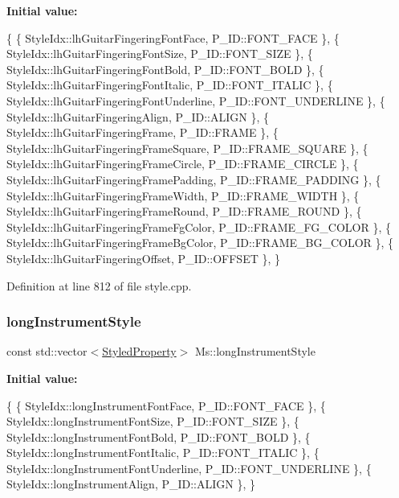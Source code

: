 {\bfseries Initial value\+:}
\begin{DoxyCode}
\{
      \{ StyleIdx::lhGuitarFingeringFontFace,          P\_ID::FONT\_FACE              \},
      \{ StyleIdx::lhGuitarFingeringFontSize,          P\_ID::FONT\_SIZE              \},
      \{ StyleIdx::lhGuitarFingeringFontBold,          P\_ID::FONT\_BOLD              \},
      \{ StyleIdx::lhGuitarFingeringFontItalic,        P\_ID::FONT\_ITALIC            \},
      \{ StyleIdx::lhGuitarFingeringFontUnderline,     P\_ID::FONT\_UNDERLINE         \},
      \{ StyleIdx::lhGuitarFingeringAlign,             P\_ID::ALIGN                  \},
      \{ StyleIdx::lhGuitarFingeringFrame,             P\_ID::FRAME                  \},
      \{ StyleIdx::lhGuitarFingeringFrameSquare,       P\_ID::FRAME\_SQUARE           \},
      \{ StyleIdx::lhGuitarFingeringFrameCircle,       P\_ID::FRAME\_CIRCLE           \},
      \{ StyleIdx::lhGuitarFingeringFramePadding,      P\_ID::FRAME\_PADDING          \},
      \{ StyleIdx::lhGuitarFingeringFrameWidth,        P\_ID::FRAME\_WIDTH            \},
      \{ StyleIdx::lhGuitarFingeringFrameRound,        P\_ID::FRAME\_ROUND            \},
      \{ StyleIdx::lhGuitarFingeringFrameFgColor,      P\_ID::FRAME\_FG\_COLOR         \},
      \{ StyleIdx::lhGuitarFingeringFrameBgColor,      P\_ID::FRAME\_BG\_COLOR         \},
      \{ StyleIdx::lhGuitarFingeringOffset,            P\_ID::OFFSET                 \},
      \}
\end{DoxyCode}


Definition at line 812 of file style.\+cpp.

\mbox{\label{namespace_ms_a5f3dbf7452895e05633a5d43e2cc8f48}} 
\subsubsection{\texorpdfstring{long\+Instrument\+Style}{longInstrumentStyle}}
{\footnotesize\ttfamily const std\+::vector$<$\hyperlink{struct_ms_1_1_styled_property}{Styled\+Property}$>$ Ms\+::long\+Instrument\+Style}

{\bfseries Initial value\+:}
\begin{DoxyCode}
\{
      \{ StyleIdx::longInstrumentFontFace,             P\_ID::FONT\_FACE              \},
      \{ StyleIdx::longInstrumentFontSize,             P\_ID::FONT\_SIZE              \},
      \{ StyleIdx::longInstrumentFontBold,             P\_ID::FONT\_BOLD              \},
      \{ StyleIdx::longInstrumentFontItalic,           P\_ID::FONT\_ITALIC            \},
      \{ StyleIdx::longInstrumentFontUnderline,        P\_ID::FONT\_UNDERLINE         \},
      \{ StyleIdx::longInstrumentAlign,                P\_ID::ALIGN                  \},
      \}
\end{DoxyCode}


